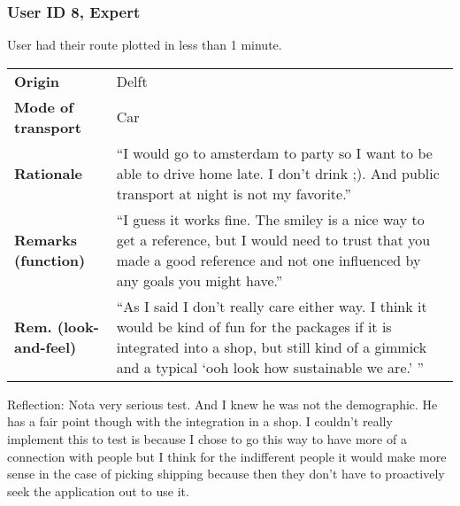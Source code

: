 \documentclass[final,a4paper,11pt]{article}
\newlength{\resulttablecolone}
\newlength{\resulttablecoltwo}
\begin{document}
\subsubsection*{User ID 8, Expert}
User had their route plotted in less than 1 minute.
\begin{table}[H]
\begin{tabular}{p{\resulttablecolone}|p{\resulttablecoltwo}}
\textbf{Origin} & Delft \\
\textbf{Mode of transport} & Car \\
\textbf{Rationale} & ``I would go to amsterdam to party so I want to be able to drive home late. I don't drink ;). And public transport at night is not my favorite.'' \\
\textbf{Remarks (function)} & ``I guess it works fine. The smiley is a nice way to get a reference, but I would need to trust that you made a good reference and not one influenced by any goals you might have.'' \\
\textbf{Rem. (look-and-feel)} & ``As I said I don't really care either way. I think it would be kind of fun for the packages if it is integrated into a shop, but still kind of a gimmick and a typical `ooh look how sustainable we are.' '' \\
\end{tabular}
\end{table}
Reflection: Nota very serious test. And I knew he was not the demographic. He has a fair point though with the integration in a shop. I couldn't really implement this to test is because I chose to go this way to have more of a connection with people but I think for the indifferent people it would make more sense in the case of picking shipping because then they don't have to proactively seek the application out to use it.
\end{document}
